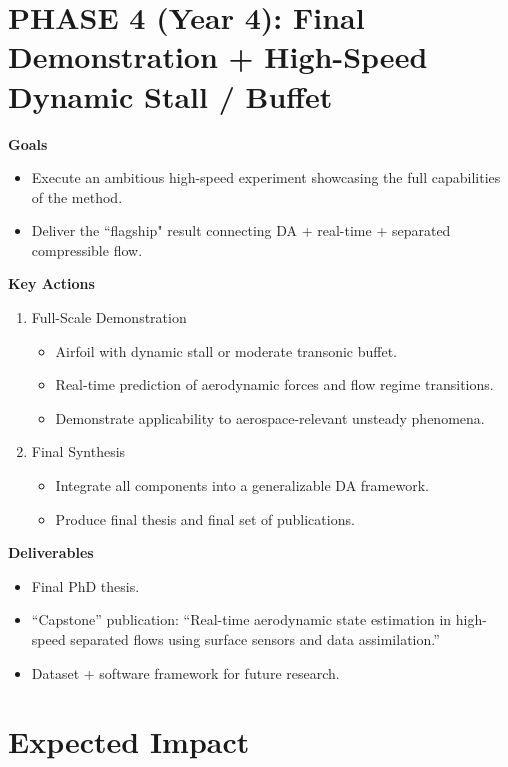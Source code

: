 \documentclass[12pt,a4paper]{article}
\begin{document}
\section{PHASE 4 (Year 4): Final Demonstration + High-Speed Dynamic Stall / Buffet}
\textbf{Goals}

\begin{itemize}
    \item Execute an ambitious high-speed experiment showcasing the full capabilities of the method.
    \item Deliver the “flagship" result connecting DA + real-time + separated compressible flow.
\end{itemize}

\textbf{Key Actions}

\begin{enumerate}
    \item Full-Scale Demonstration
    \begin{itemize}
        \item Airfoil with dynamic stall or moderate transonic buffet.
        \item Real-time prediction of aerodynamic forces and flow regime transitions.
        \item Demonstrate applicability to aerospace-relevant unsteady phenomena.
    \end{itemize}
    \item Final Synthesis
    \begin{itemize}
        \item Integrate all components into a generalizable DA framework.
        \item Produce final thesis and final set of publications.
    \end{itemize}
\end{enumerate}

\textbf{Deliverables}

\begin{itemize}
    \item Final PhD thesis.
    \item “Capstone” publication: “Real-time aerodynamic state estimation in high-speed separated flows using surface sensors and data assimilation.”
    \item Dataset + software framework for future research.
\end{itemize}

\section{Expected Impact}
\end{document}
